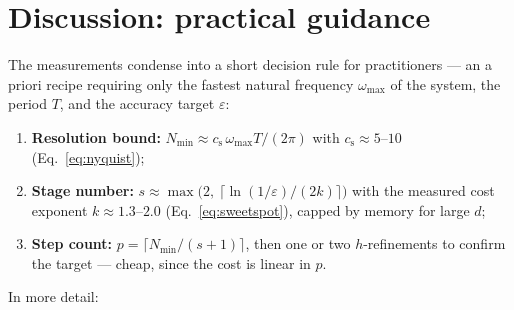 \documentclass[Afour,sageh,times]{sagej}
\begin{document}
\section{Discussion: practical guidance}
\label{sec:discussion}

The measurements condense into a short decision rule for practitioners ---
an a priori recipe requiring only the fastest natural frequency
$\omega_{\max}$ of the system, the period $T$, and the accuracy target
$\varepsilon$:
\begin{enumerate}
  \item \textbf{Resolution bound:} $N_{\min} \approx
        c_\mathrm{s}\,\omega_{\max}T/(2\pi)$
        with $c_\mathrm{s} \approx 5$--$10$ (Eq.~\eqref{eq:nyquist});
  \item \textbf{Stage number:} $s \approx \max\bigl(2,\
        \lceil\ln(1/\varepsilon)/(2k)\rceil\bigr)$ with the measured cost
        exponent $k \approx 1.3$--$2.0$ (Eq.~\eqref{eq:sweetspot}), capped by
        memory for large $d$;
  \item \textbf{Step count:} $p = \lceil N_{\min}/(s{+}1)\rceil$, then one or
        two $h$-refinements to confirm the target --- cheap, since the cost
        is linear in $p$.
\end{enumerate}
In more detail:
\end{document}
